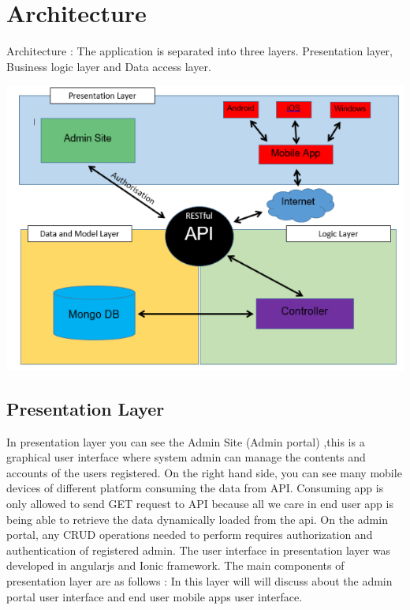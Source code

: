 	\section{Architecture}
	Architecture : The application is separated into three layers.  Presentation layer, Business logic layer and Data access layer.
	\begin{center}    
		\includegraphics{img/architecture.PNG}
	\end{center}
		\subsection{Presentation Layer}
		 In presentation layer you can see the Admin Site (Admin portal) ,this is a graphical user interface where system admin can manage the contents and accounts of the users registered.  On the right hand side, you can see many mobile devices of different platform consuming the data from API. Consuming app is only allowed to send GET request to API because all we care in end user app is being able to retrieve the data dynamically loaded from the api. On the admin portal, any CRUD operations needed to perform requires authorization and authentication of registered admin. The user interface in presentation layer was developed in angularjs and Ionic framework. The main components of presentation layer are as follows : In this layer will will discuss about the admin portal user interface and end user mobile apps user interface. 
		
